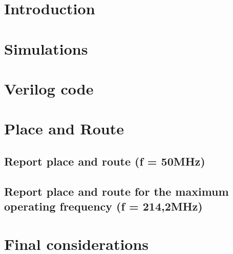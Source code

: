 \documentclass[a4paper]{article}
\begin{document}
	
	
	\tableofcontents
	\pagebreak	
	\setcounter{page}{1}
	
	\section{Introduction}
		
	
	\section{Simulations}
		

	\section{Verilog code}
		
	
	\section{Place and Route}
		\subsection{ Report place and route (f = 50MHz)}
			
		\subsection{ Report place and route for the maximum operating frequency (f = 214,2MHz)}
			
	
	\section{ Final considerations}
		
		
	\listoffigures
	\renewcommand\listoflistingscaption{List of source codes}
	\listoflistings
		
\end{document}
